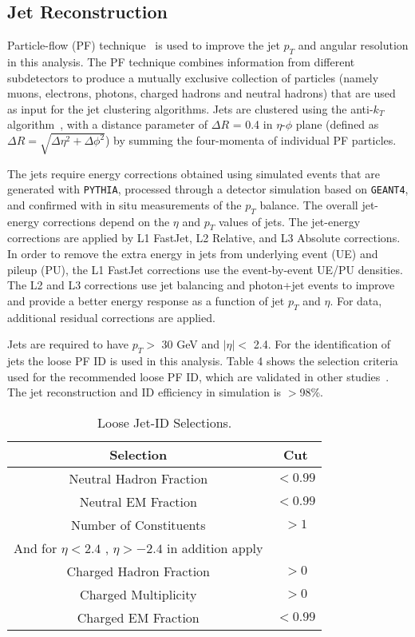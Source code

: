 \subsection{Jet Reconstruction}

Particle-flow (PF) technique~\cite{CMS-PAS-PFT-09-001,CMS-PAS-PFT-10-002} is used to improve the jet $p_T$ and angular resolution in this analysis.
The PF technique combines information from different subdetectors to produce a mutually exclusive collection of particles (namely muons, electrons, photons, 
charged hadrons and neutral hadrons) that are used as input for the jet clustering algorithms.
Jets are clustered using the anti-$k_{T}$ algorithm~\cite{anti-kT}, with a distance parameter of $\Delta R$ = 0.4 in $\eta$-$\phi$ plane (defined as $\Delta R = 
\sqrt{\Delta \eta^2 + \Delta \phi^2}$) by summing the four-momenta of individual PF particles.

The jets require energy corrections obtained using simulated events that are generated with \texttt{PYTHIA}, processed through a detector simulation based on 
\texttt{GEANT4}, and confirmed with in situ measurements of the $p_T$ balance.
The overall jet-energy corrections depend on the $\eta$ and $p_T$ values of jets.
The jet-energy corrections are applied by L1 FastJet, L2 Relative, and L3 Absolute corrections. In order to remove the extra energy in jets from underlying event 
(UE) and pileup (PU), the L1 FastJet corrections use the event-by-event UE/PU densities.
The L2 and L3 corrections use jet balancing and photon+jet events to improve and provide a better energy response as a function of jet $p_T$ and $\eta$.
For data, additional residual corrections are applied.

Jets are required to have $p_T >$ 30 GeV and $|\eta| <$ 2.4.
For the identification of jets the loose PF ID is used in this analysis.
Table 4 shows the selection criteria used for the recommended loose PF ID, which are validated in other studies~\cite{CMS-PAS-FSQ-12-035}.
The jet reconstruction and ID efficiency in simulation is $>$98\%.

\begin{table}[ht]
\begin{center}
 \caption{Loose Jet-ID Selections.\label{tab:jetId}}
 \begin{tabular}{|cc|}
 \hline\hline
       Selection                        & Cut        \\[0.5ex] \hline
       Neutral Hadron Fraction          & $<0.99$      \\
       Neutral EM Fraction              & $<0.99$      \\
       Number of Constituents           & $> 1$        \\
       And for $\eta < 2.4$ , $\eta > -2.4$ in addition apply &\\
       Charged Hadron Fraction 	        & $> 0$   \\
       Charged Multiplicity             & $> 0$   \\
       Charged EM Fraction              & $<0.99$ \\
 \hline
 \hline
 \end{tabular}
\end{center}
\end{table}

